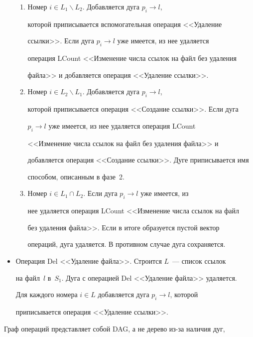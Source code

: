 \begin{multicols}{2}
\begin{itemize}
\begin{enumerate}[1.]
\item Номер $i \in L_1\backslash L_2$. Добавляется дуга $p_i\rightarrow l$,\linebreak 


которой приписывается вспомогательная операция <<Удаление 


ссылки>>. Если дуга $p_i\rightarrow l$ уже имеется, из нее удаляется 


операция LCount <<Изменение числа ссылок на файл без удаления 


файла>> и добавляется операция <<Удаление ссылки>>.


\item Номер $i \in L_2\backslash L_1$. Добавляется дуга $p_i\rightarrow l$, 


которой приписывается операция <<Создание ссылки>>. Если дуга 


$p_i\rightarrow l$ уже имеется, из нее удаляется операция LCount 


<<Изменение числа ссылок на файл без удаления файла>> и 


добавляется операция <<Создание ссылки>>. Дуге приписывается имя 


способом, описанным в фазе~2. 


\item Номер $i\in L_1\cap L_2$. Если дуга $p_i\rightarrow l$ уже имеется, из 


нее удаляется операция LCount <<Изменение числа ссылок на файл 


без удаления файла>>. Если в итоге образуется пустой вектор 


операций, дуга удаляется. В противном случае дуга сохраняется.


\end{enumerate}


\item Операция Del <<Удаление файла>>. Строится $L$~--- список ссылок 


на файл~$l$ в~$S_1$. Дуга с операцией Del <<Удаление файла>> удаляется. 


Для каждого номера $i\in L$ добавляется дуга $p_i \rightarrow l$, которой 


приписывается операция <<Удаление ссылки>>.


\end{itemize}





      Граф операций представляет собой DAG, а не дерево из-за наличия дуг, 



\end{multicols}
